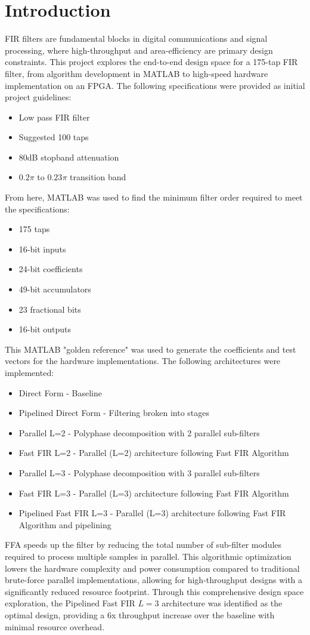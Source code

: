 \documentclass[12pt]{article}
\begin{document}
\section{Introduction}
FIR filters are fundamental blocks in digital communications and signal processing, where high-throughput and area-efficiency are primary design constraints. This project explores the end-to-end design space for a 175-tap FIR filter, from algorithm development in MATLAB to high-speed hardware implementation on an FPGA. The following specifications were provided as initial project guidelines:
\begin{itemize}
    \item Low pass FIR filter
    \item Suggested 100 taps
    \item 80dB stopband attenuation
    \item $0.2\pi$ to $0.23\pi$ transition band
\end{itemize}
From here, MATLAB was used to find the minimum filter order required to meet the specifications:
\begin{itemize}
    \item 175 taps
    \item 16-bit inputs
    \item 24-bit coefficients
    \item 49-bit accumulators
    \item 23 fractional bits
    \item 16-bit outputs
\end{itemize}
This MATLAB "golden reference" was used to generate the coefficients and test vectors for the hardware implementations. The following architectures were implemented:
\begin{itemize}
    \item Direct Form - Baseline
    \item Pipelined Direct Form - Filtering broken into stages
    \item Parallel L=2 - Polyphase decomposition with 2 parallel sub-filters
    \item Fast FIR L=2 - Parallel (L=2) architecture following Fast FIR Algorithm
    \item Parallel L=3 - Polyphase decomposition with 3 parallel sub-filters
    \item Fast FIR L=3 - Parallel (L=3) architecture following Fast FIR Algorithm
    \item Pipelined Fast FIR L=3 - Parallel (L=3) architecture following Fast FIR Algorithm and pipelining
\end{itemize}
FFA speeds up the filter by reducing the total number of sub-filter modules required to process multiple samples in parallel. This algorithmic optimization lowers the hardware complexity and power consumption compared to traditional brute-force parallel implementations, allowing for high-throughput designs with a significantly reduced resource footprint. Through this comprehensive design space exploration, the Pipelined Fast FIR $L=3$ architecture was identified as the optimal design, providing a 6x throughput increase over the baseline with minimal resource overhead.
\end{document}
